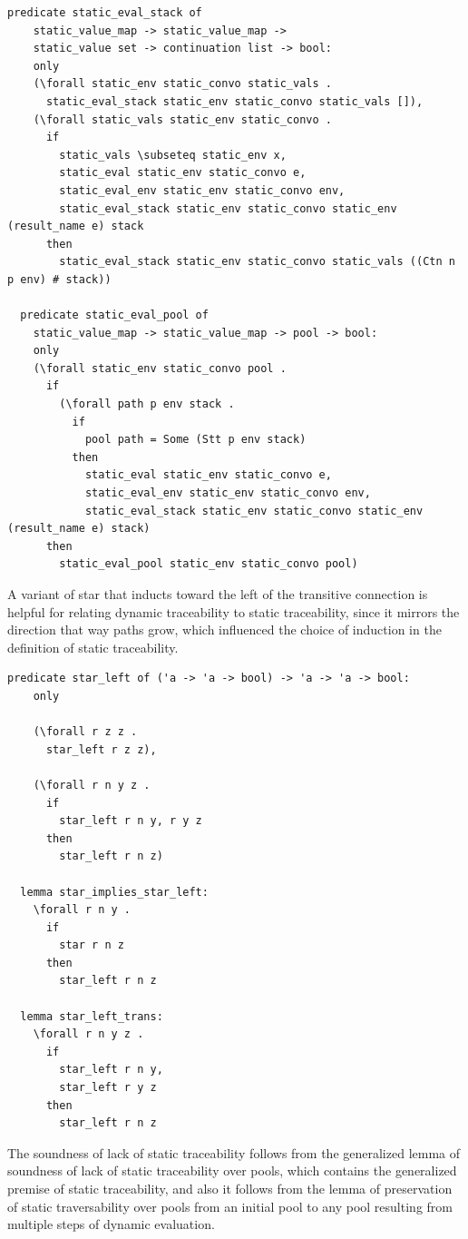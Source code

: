 \documentclass{article}
\begin{document}
\begin{lstlisting}[language=logic, mathescape]
  predicate static_eval_stack of
    static_value_map -> static_value_map ->
    static_value set -> continuation list -> bool:
    only 
    (\forall static_env static_convo static_vals .
      static_eval_stack static_env static_convo static_vals []),
    (\forall static_vals static_env static_convo . 
      if 
        static_vals \subseteq static_env x,
        static_eval static_env static_convo e,
        static_eval_env static_env static_convo env,
        static_eval_stack static_env static_convo static_env (result_name e) stack 
      then
        static_eval_stack static_env static_convo static_vals ((Ctn n p env) # stack))

  predicate static_eval_pool of
    static_value_map -> static_value_map -> pool -> bool:
    only
    (\forall static_env static_convo pool .
      if
        (\forall path p env stack .
          if
            pool path = Some (Stt p env stack)
          then 
            static_eval static_env static_convo e,
            static_eval_env static_env static_convo env,
            static_eval_stack static_env static_convo static_env (result_name e) stack)
      then 
        static_eval_pool static_env static_convo pool)
  \end{lstlisting}


A variant of star that inducts toward the left of the transitive connection is helpful for
relating dynamic traceability to static traceability, since it mirrors the direction that way
paths grow, which influenced the choice of induction in the definition of static
traceability.

\begin{lstlisting}[language=logic, mathescape]
  predicate star_left of ('a -> 'a -> bool) -> 'a -> 'a -> bool:
    only

    (\forall r z z .
      star_left r z z),

    (\forall r n y z .
      if
        star_left r n y, r y z
      then
        star_left r n z)

  lemma star_implies_star_left:
    \forall r n y .
      if
        star r n z
      then
        star_left r n z

  lemma star_left_trans:
    \forall r n y z .
      if 
        star_left r n y,
        star_left r y z 
      then
        star_left r n z
\end{lstlisting}

The soundness of lack of static traceability follows from the generalized lemma
of soundness of lack of static traceability over pools, which contains
the generalized premise of
static traceability, and also it follows from the lemma of preservation of static
traversability over pools from an initial pool to any pool resulting from multiple steps of
dynamic evaluation.
\end{document}
